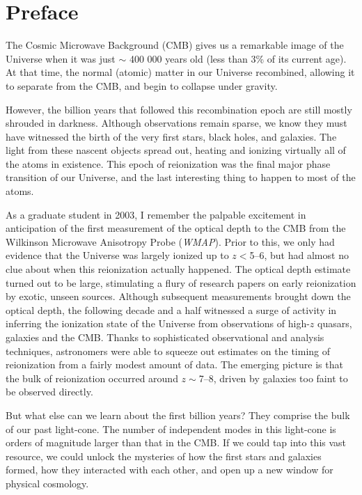 \chapter*{Preface}
\label{Preface}


The Cosmic Microwave Background (CMB) gives us a remarkable image of the Universe when it was just $\sim$ 400 000 years old (less than 3\% of its current age).  At that time, the normal (atomic) matter in our Universe recombined, allowing it to separate from the CMB, and begin to collapse under gravity.

However, the billion years that followed this recombination epoch are still mostly shrouded in darkness.  Although observations remain sparse, we know they must have witnessed the birth of the very first stars, black holes, and galaxies.  The light from these nascent objects spread out, heating and ionizing virtually all of the atoms in existence.  This epoch of reionization was the final major phase transition of our Universe, and the last interesting thing to happen to most of the atoms.

As a graduate student in 2003, I remember the palpable excitement in anticipation of the first measurement of the optical depth to the CMB from the Wilkinson Microwave Anisotropy Probe ({\it WMAP}).  Prior to this, we only had evidence that the Universe was largely ionized up to $z<$5--6, but had almost no clue about when this reionization actually happened.  The optical depth estimate turned out to be large, stimulating a flury of research papers on early reionization by exotic, unseen sources.  Although subsequent measurements brought down the optical depth, the following decade and a half witnessed a surge of activity in inferring the ionization state of the Universe
from observations of high-$z$ quasars, galaxies and the CMB.  Thanks to sophisticated observational and analysis techniques, astronomers were able to squeeze out estimates on the timing of reionization from a fairly modest amount of data.
The emerging picture is that the bulk of reionization occurred around $z\sim$7--8, driven by galaxies too faint to be observed directly.

But what else can we learn about the first billion years?  They comprise the bulk of our past light-cone.  The number of independent modes in this light-cone is orders of magnitude larger than that in the CMB.  If we could tap into this vast resource, we could unlock the mysteries of how the first stars and galaxies formed, how they interacted with each other, and open up a new window for physical cosmology.

